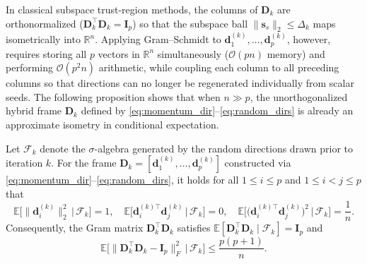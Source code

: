 \documentclass[smallextended]{svjour3}
\newcommand{\bd}{\bm{d}}
\newcommand{\bs}{\bm{s}}
\begin{document}
In classical subspace trust-region methods, the columns of $\bm D_k$ are orthonormalized ($\bm D_k^\top \bm D_k = \bm I_p$) so that the subspace ball $\|\bs_s\|_2 \le \Delta_k$ maps isometrically into $\mathbb{R}^n$. Applying Gram--Schmidt to $\bd_1^{(k)}, \ldots, \bd_p^{(k)}$, however, requires storing all $p$ vectors in $\mathbb{R}^n$ simultaneously ($\mathcal{O}(pn)$ memory) and performing $\mathcal{O}(p^2 n)$ arithmetic, while coupling each column to all preceding columns so that directions can no longer be regenerated individually from scalar seeds. The following proposition shows that when $n \gg p$, the unorthogonalized hybrid frame $\bm D_k$ defined by \eqref{eq:momentum_dir}--\eqref{eq:random_dirs} is already an approximate isometry in conditional expectation.

\begin{proposition}
\label{prop:gram_isometry}
Let $\mathcal{F}_k$ denote the $\sigma$-algebra generated by the random directions drawn prior to iteration $k$. For the frame $\bm D_k = [\bd_1^{(k)}, \ldots, \bd_p^{(k)}]$ constructed via \eqref{eq:momentum_dir}--\eqref{eq:random_dirs}, it holds for all $1 \le i \le p$ and $1 \le i < j \le p$ that
\begin{equation}
\mathbb E\bigl[\|\bd_i^{(k)}\|_2^2 \,\big|\, \mathcal{F}_k\bigr] = 1,
\quad
\mathbb E\bigl[\bd_i^{(k)\top} \bd_j^{(k)} \,\big|\, \mathcal{F}_k\bigr] = 0,
\quad
\mathbb E\bigl[ \bigl(\bd_i^{(k)\top} \bd_j^{(k)}\bigr)^2 \,\big|\, \mathcal{F}_k\bigr] = \frac{1}{n}.
\label{eq:near_ortho}
\end{equation}
Consequently, the Gram matrix $\bm D_k^\top \bm D_k$ satisfies $\mathbb{E}[\bm D_k^\top \bm D_k \mid \mathcal{F}_k] = \bm I_p$ and
\[
\mathbb{E}\bigl[\|\bm D_k^\top \bm D_k - \bm I_p\|_F^2 \,\big|\, \mathcal{F}_k\bigr] \le \frac{p(p+1)}{n}.
\]
\end{proposition}
\end{document}
